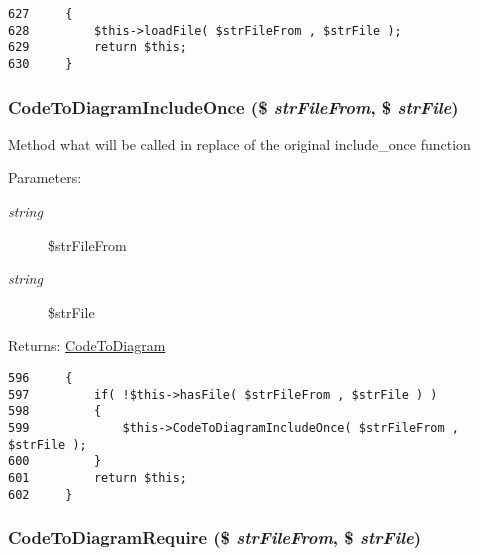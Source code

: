 \begin{Code}\begin{verbatim}627     {
628         $this->loadFile( $strFileFrom , $strFile );
629         return $this;
630     }
\end{verbatim}
\end{Code}


\hypertarget{class_code_to_diagram_ebab1d697349f315022eeaf64c792172}{
\subsubsection[{CodeToDiagramIncludeOnce}]{\setlength{\rightskip}{0pt plus 5cm}CodeToDiagramIncludeOnce (\$ {\em strFileFrom}, \/  \$ {\em strFile})}}
\label{class_code_to_diagram_ebab1d697349f315022eeaf64c792172}


Method what will be called in replace of the original include\_\-once function

\begin{Desc}
\item[Parameters:]
\begin{description}
\item[{\em string}]\$strFileFrom \item[{\em string}]\$strFile \end{description}
\end{Desc}
\begin{Desc}
\item[Returns:]\hyperlink{class_code_to_diagram}{CodeToDiagram} \end{Desc}


\begin{Code}\begin{verbatim}596     {
597         if( !$this->hasFile( $strFileFrom , $strFile ) )
598         {
599             $this->CodeToDiagramIncludeOnce( $strFileFrom , $strFile );
600         }
601         return $this;
602     }
\end{verbatim}
\end{Code}


\hypertarget{class_code_to_diagram_14610b43e210992a460d7eebbbe3c167}{
\subsubsection[{CodeToDiagramRequire}]{\setlength{\rightskip}{0pt plus 5cm}CodeToDiagramRequire (\$ {\em strFileFrom}, \/  \$ {\em strFile})}}
\label{class_code_to_diagram_14610b43e210992a460d7eebbbe3c167}


